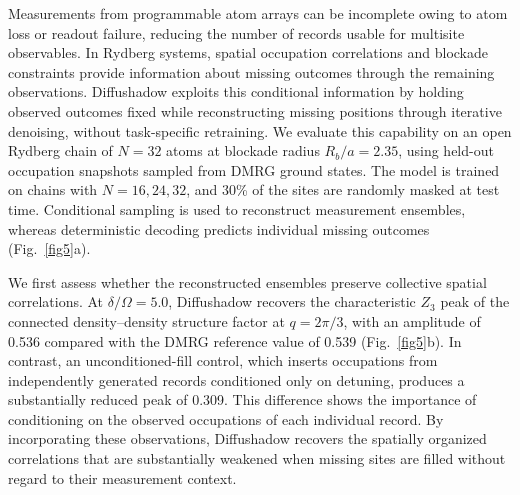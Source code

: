 \documentclass[pdflatex,sn-nature]{sn-jnl}%
\theoremstyle{thmstyleone}%
\theoremstyle{thmstyletwo}%
\theoremstyle{thmstylethree}%
\begin{document}




Measurements from programmable atom arrays can be incomplete owing to atom loss or readout failure, reducing the number of records usable for multisite observables. In Rydberg systems, spatial occupation correlations and blockade constraints provide information about missing outcomes through the remaining observations. Diffushadow exploits this conditional information by holding observed outcomes fixed while reconstructing missing positions through iterative denoising, without task-specific retraining. We evaluate this capability on an open Rydberg chain of $N=32$ atoms at blockade radius $R_b/a=2.35$, using held-out occupation snapshots sampled from DMRG ground states. The model is trained on chains with $N=16,24,32$, and 30\% of the sites are randomly masked at test time. Conditional sampling is used to reconstruct measurement ensembles, whereas deterministic decoding predicts individual missing outcomes (Fig.~\ref{fig5}a).

We first assess whether the reconstructed ensembles preserve collective spatial correlations. At $\delta/\Omega=5.0$, Diffushadow recovers the characteristic $Z_3$ peak of the connected density--density structure factor at $q=2\pi/3$, with an amplitude of 0.536 compared with the DMRG reference value of 0.539 (Fig.~\ref{fig5}b). In contrast, an unconditioned-fill control, which inserts occupations from independently generated records conditioned only on detuning, produces a substantially reduced peak of 0.309. This difference shows the importance of conditioning on the observed occupations of each individual record. By incorporating these observations, Diffushadow recovers the spatially organized correlations that are substantially weakened when missing sites are filled without regard to their measurement context.
\end{document}
